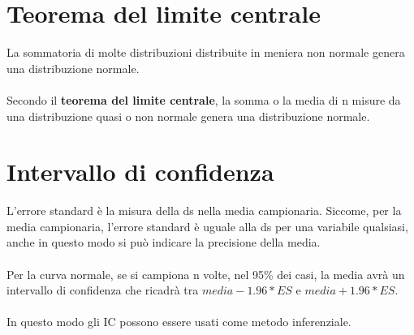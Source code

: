 \documentclass[10pt, draft]{book}
\begin{document}
\section{Teorema del limite centrale}
La sommatoria di molte distribuzioni distribuite in meniera non normale genera una distribuzione normale.
\\
\\
Secondo il \textbf{teorema del limite centrale}, la somma o la media di n misure da una distribuzione quasi o non normale genera una distribuzione normale.

\section{Intervallo di confidenza}
L’errore standard è la misura della ds nella media campionaria. Siccome, per la media campionaria, l’errore standard è uguale alla ds per una variabile qualsiasi, anche in questo modo si può indicare la precisione della media.
\\
\\
Per la curva normale, se si campiona n volte, nel 95\% dei casi, la media avrà un intervallo di confidenza che ricadrà tra $media-1.96*ES$ e $media+1.96*ES$.
\\
\\
In questo modo gli IC possono essere usati come metodo inferenziale.
\end{document}
